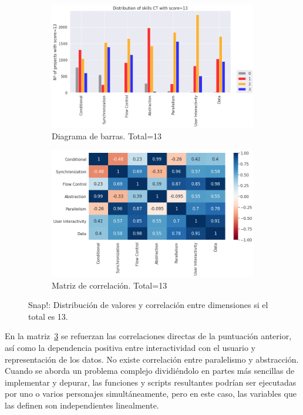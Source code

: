 \documentclass[a4paper, 12pt]{book}
\begin{document}
\begin{figure}[H]
    \centering
    \begin{subfigure}[h]{.49\textwidth} 
        \includegraphics[width=\textwidth]{img/distribucion_13_Snap}
        \caption{Diagrama de barras. Total=13}
        \label{fig:total13_Snap}
    \end{subfigure}       
    \begin{subfigure}[h]{.49\textwidth} 
        \includegraphics[width=\textwidth]{img/corr_13_Snap}
        \caption{Matriz de correlación. Total=13}
        \label{fig:corr13_Snap}
    \end{subfigure}
    \caption{Snap!: Distribución de valores y correlación entre dimensiones si el total es 13.}
\end{figure}

En la matriz~\ref{fig:corr13_Snap} se refuerzan las correlaciones directas de la puntuación anterior, así como la dependencia positiva entre interactividad con el usuario y representación de los datos. No existe correlación entre paralelismo y abstracción. Cuando se aborda un problema complejo dividiéndolo en partes más sencillas de implementar y depurar, las funciones y scripts resultantes podrían ser ejecutadas por uno o varios personajes simultáneamente, pero en este caso, las variables que las definen son independientes linealmente.
\end{document}
